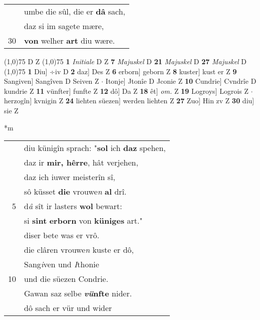 \documentclass[8pt,a4paper,notitlepage]{article}
\begin{document}
\begin{table}[ht]
\begin{minipage}[t]{0.5\linewidth}
\begin{tabular}{rl}
 & umbe die sûl, die er \textbf{dâ} sach,\\ 
 & daz si im sagete mære,\\ 
30 & \textbf{von} welher \textbf{art} diu wære.\\ 
\end{tabular}
\scriptsize
\line(1,0){75} \newline
D Z \newline
\line(1,0){75} \newline
\textbf{1} \textit{Initiale} D Z  \textbf{7} \textit{Majuskel} D  \textbf{21} \textit{Majuskel} D  \textbf{27} \textit{Majuskel} D  \newline
\line(1,0){75} \newline
\textbf{1} Diu] ÷iv D \textbf{2} daz] Des Z \textbf{6} erborn] geborn Z \textbf{8} kuster] kust er Z \textbf{9} Sangiven] Sangîven D Seiven Z  $\cdot$ Itonje] Jtonîe D Jconie Z \textbf{10} Cundrie] Cvndrîe D kundrie Z \textbf{11} vünfter] funfte Z \textbf{12} dô] Da Z \textbf{18} êt] \textit{om.} Z \textbf{19} Logroys] Logrois Z  $\cdot$ herzogîn] kvnigin Z \textbf{24} liehten süezen] werden liehten Z \textbf{27} Zuo] Hin zv Z \textbf{30} diu] sie Z \newline
\end{minipage}
\hspace{0.5cm}
\begin{minipage}[t]{0.5\linewidth}
\small
\begin{center}*m
\end{center}
\begin{tabular}{rl}
 & diu künigîn sprach: "\textbf{sol} ich \textbf{daz} spehen,\\ 
 & daz ir \textbf{mir, hêrre}, hât verjehen,\\ 
 & daz ich iuwer meisterîn sî,\\ 
 & sô küsset \textbf{die} vrouwe\textit{n} \textbf{al} drî.\\ 
5 & d\textit{â} sît ir lasters \textbf{wol} bewart:\\ 
 & si \textbf{sint} \textbf{erborn} von \textbf{küniges} art."\\ 
 & diser bete was er vrô.\\ 
 & die clâren vrouwe\textit{n} kuste er dô,\\ 
 & Sang\textit{i}ven und \textit{I}thonie\\ 
10 & und die süezen Condrie.\\ 
 & Gawan saz selbe \textbf{\textit{vü}nfte} nider.\\ 
 & dô sach er vür und wider\\ 

\end{tabular}
\end{minipage}
\end{table}
\end{document}
